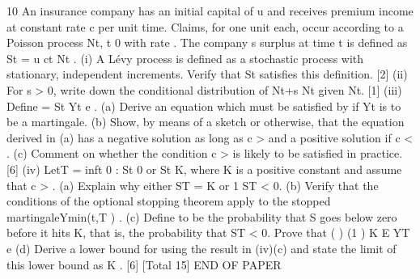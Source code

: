 



10 An insurance company has an initial capital of u and receives premium income at
constant rate c per unit time. Claims, for one unit each, occur according to a Poisson
process {Nt, t 0} with rate . The company s surplus at time t is defined as
St = u ct Nt .
(i) A Lévy process is defined as a stochastic process with stationary, independent
increments. Verify that St satisfies this definition. [2]
(ii) For s > 0, write down the conditional distribution of Nt+s Nt given Nt. [1]
(iii) Define = St
Yt e .
(a) Derive an equation which must be satisfied by if Yt is to be a
martingale.
(b) Show, by means of a sketch or otherwise, that the equation derived in
(a) has a negative solution as long as c > and a positive solution
if c < .
(c) Comment on whether the condition c > is likely to be satisfied in
practice. [6]
(iv) LetT = inf{t 0 : St 0 or St K}, where K is a positive constant and assume
that c > .
(a) Explain why either ST = K or 1 ST < 0.
(b) Verify that the conditions of the optional stopping theorem apply to the
stopped martingaleYmin(t,T ) .
(c) Define to be the probability that S goes below zero before it hits K,
that is, the probability that ST < 0. Prove that
( ) (1 ) K
E YT e
(d) Derive a lower bound for using the result in (iv)(c) and state the
limit of this lower bound as K . [6]
[Total 15]
END OF PAPER


